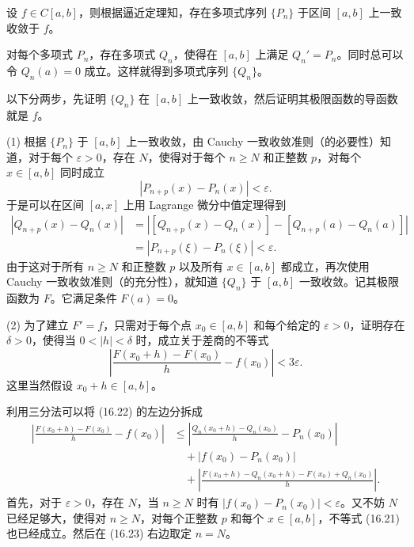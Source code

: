 \begin{xproof}
设 $f\in C[a,b]$，则根据逼近定理知，存在多项式序列 $\{P_n\}$ 于区间 $[a,b]$ 上一致收敛于 $f$。

对每个多项式 $P_n$，存在多项式 $Q_n$，使得在 $[a,b]$ 上满足 $Q_n'=P_n$。同时总可以令 $Q_n(a)=0$ 成立。这样就得到多项式序列 $\{Q_n\}$。

以下分两步，先证明 $\{Q_n\}$ 在 $[a,b]$ 上一致收敛，然后证明其极限函数的导函数就是 $f$。

(1) 根据 $\{P_n\}$ 于 $[a,b]$ 上一致收敛，由 Cauchy 一致收敛准则（的必要性）知道，对于每个 $\varepsilon>0$，存在 $N$，使得对于每个 $n\geqslant N$ 和正整数 $p$，对每个 $x\in[a,b]$ 同时成立
\begin{equation}
  |P_{n+p}(x)-P_n(x)|<\varepsilon.
\tag{16.21}
\label{eq:16.21}
\end{equation}
于是可以在区间 $[a,x]$ 上用 Lagrange 微分中值定理得到
\[
\begin{aligned}
  |Q_{n+p}(x)-Q_n(x)|
  &=|[Q_{n+p}(x)-Q_n(x)]-[Q_{n+p}(a)-Q_n(a)]|\\
  &=|P_{n+p}(\xi)-P_n(\xi)|<\varepsilon.
\end{aligned}
\]
由于这对于所有 $n\geqslant N$ 和正整数 $p$ 以及所有 $x\in[a,b]$ 都成立，再次使用 Cauchy 一致收敛准则（的充分性），就知道 $\{Q_n\}$ 于 $[a,b]$ 一致收敛。记其极限函数为 $F$。它满足条件 $F(a)=0$。

(2) 为了建立 $F'=f$，只需对于每个点 $x_0\in[a,b]$ 和每个给定的 $\varepsilon>0$，证明存在 $\delta>0$，使得当 $0<|h|<\delta$ 时，成立关于差商的不等式
\begin{equation}
  \left|\frac{F(x_0+h)-F(x_0)}h-f(x_0)\right|<3\varepsilon.
\tag{16.22}
\label{eq:16.22}
\end{equation}
这里当然假设 $x_0+h\in[a,b]$。

利用三分法可以将 (16.22) 的左边分拆成
\begin{equation}
\begin{aligned}
  \left|\frac{F(x_0+h)-F(x_0)}h-f(x_0)\right|
  &\leqslant\left|\frac{Q_n(x_0+h)-Q_n(x_0)}h-P_n(x_0)\right|\\
  &\quad+|f(x_0)-P_n(x_0)|\\
  &\quad+\left|\frac{F(x_0+h)-Q_n(x_0+h)-F(x_0)+Q_n(x_0)}h\right|.
\end{aligned}
\tag{16.23}
\label{eq:16.23}
\end{equation}
首先，对于 $\varepsilon>0$，存在 $N$，当 $n\geqslant N$ 时有 $|f(x_0)-P_n(x_0)|<\varepsilon$。又不妨 $N$ 已经足够大，使得对 $n\geqslant N$，对每个正整数 $p$ 和每个 $x\in[a,b]$，不等式 (16.21) 也已经成立。然后在 (16.23) 右边取定 $n=N$。


\end{xproof}
